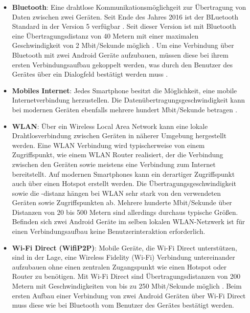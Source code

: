 \begin{itemize}
	\item \textbf{Bluetooth}: Eine drahtlose Kommunikationsmöglichgeit zur Übertragung von Daten zwischen zwei Geräten. Seit Ende des Jahres 2016 ist der BLuetooth Standard in der Version 5 verfügbar \cite{bluetoothPressRelease}. Seit dieser Version ist mit Bluetooth eine Übertragungsdistanz von 40 Metern mit einer maximalen Geschwindigkeit von 2 Mbit/Sekunde möglich \cite{bluetooth5}. 
	Um eine Verbindung über Bluetooth mit zwei Android Geräte aufzubauen, müssen diese bei ihrem ersten Verbindungsaufbau gekoppelt werden, was durch den Benutzer des Gerätes über ein Dialogfeld bestätigt werden muss \cite{android-bluetooth}. 
	\item \textbf{Mobiles Internet}: Jedes Smartphone besitzt die Möglichkeit, eine mobile Internetverbindung herzustellen. Die Datenübertragungsgeschwindigkeit kann bei modernen Geräten ebenfalls mehrere hundert Mbit/Sekunde betragen \cite{lte}. 
	\item \textbf{WLAN}: Über ein Wireless Local Area Network kann eine lokale Drahtlosverbindung zwischen Geräten in näherer Umgebung hergestellt werden. Eine WLAN Verbindung wird typischerweise von einem Zugriffspunkt, wie einem WLAN Router realisiert, der die Verbindung zwischen den Geräten sowie meistens eine Verbindung zum Internet bereitstellt. Auf modernen Smartphones kann ein derartiger Zugriffspunkt auch über einen Hotspot erstellt werden. Die Übertragungsgeschwindigkeit sowie die -distanz hängen bei WLAN sehr stark von den verwendeten Geräten sowie Zugriffspunkten ab. Mehrere hunderte Mbit/Sekunde über Distanzen von 20 bis 500 Metern sind allerdings durchaus typische Größen. 
	Befinden sich zwei Android Geräte im selben lokalen WLAN-Netzwerk ist für einen Verbindungsaufbau keine Benutzerinteraktion erforderlich. 
	\item \textbf{Wi-Fi Direct (WifiP2P)}: Mobile Geräte, die Wi-Fi Direct unterstützen, sind in der Lage, eine Wireless Fidelity (Wi-Fi) Verbindung untereinander aufzubauen ohne einen zentralen Zugangspunkt wie einen Hotspot oder Router zu benötigen. Mit Wi-Fi Direct sind Übertragungsdistanzen von 200 Metern mit Geschwindigkeiten von bis zu 250 Mbit/Sekunde möglich \cite{wifidirect}. Beim ersten Aufbau einer Verbindung von zwei Android Geräten über Wi-Fi Direct muss diese wie bei Bluetooth vom Benutzer des Gerätes bestätigt werden. 
\end{itemize}

